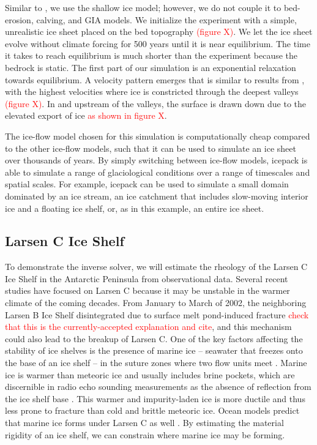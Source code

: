 \documentclass{article}
\theoremstyle{definition}
\theoremstyle{plain}
\begin{document}
Similar to \cite{kessler2008fjord}, we use the shallow ice model; however, we do not couple it to bed-erosion, calving, and GIA models. We initialize the experiment with a simple, unrealistic ice sheet placed on the bed topography \textcolor{red}{(figure X)}. We let the ice sheet evolve without climate forcing for 500 years until it is near equilibrium. The time it takes to reach equilibrium is much shorter than the \cite{kessler2008fjord} experiment because the bedrock is static. The first part of our simulation is an exponential relaxation towards equilibrium. A velocity pattern emerges that is similar to results from \cite{kessler2008fjord}, with the highest velocities where ice is constricted through the deepest valleys \textcolor{red}{(figure X)}. In and upstream of the valleys, the surface is drawn down due to the elevated export of ice \textcolor{red}{as shown in figure X}.  

The ice-flow model chosen for this simulation is computationally cheap compared to the other ice-flow models, such that it can be used to simulate an ice sheet over thousands of years. By simply switching between ice-flow models, icepack is able to simulate a range of glaciological conditions over a range of timescales and spatial scales. For example, icepack can be used to simulate a small domain dominated by an ice stream, an ice catchment that includes slow-moving interior ice and a floating ice shelf, or, as in this example, an entire ice sheet. 

\subsection{Larsen C Ice Shelf}

To demonstrate the inverse solver, we will estimate the rheology of the Larsen C Ice Shelf in the Antarctic Peninsula from observational data.
Several recent studies have focused on Larsen C because it may be unstable in the warmer climate of the coming decades.
From January to March of 2002, the neighboring Larsen B Ice Shelf disintegrated due to surface melt pond-induced fracture \textcolor{red}{check that this is the currently-accepted explanation and cite}, and this mechanism could also lead to the breakup of Larsen C.
One of the key factors affecting the stability of ice shelves is the presence of marine ice -- seawater that freezes onto the base of an ice shelf -- in the suture zones where two flow units meet \citep{kulessa2014marine}.
Marine ice is warmer than meteoric ice and usually includes brine pockets, which are discernible in radio echo sounding measurements as the absence of reflection from the ice shelf base \citep{holland2009marine}.
This warmer and impurity-laden ice is more ductile and thus less prone to fracture than cold and brittle meteoric ice.
Ocean models predict that marine ice forms under Larsen C as well \citep{holland2009marine}.
By estimating the material rigidity of an ice shelf, we can constrain where marine ice may be forming.
\end{document}
